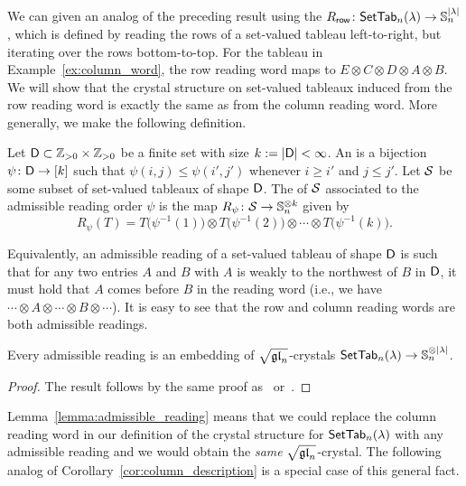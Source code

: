 \documentclass[11pt]{article}
\begin{document}
We can given an analog of the preceding result using the  $R_{\mathsf{row}} \colon \mathsf{SetTab}_n(\lambda) \to \mathbb{S}_n^{\lvert \lambda \rvert}$, which is defined by reading 
the rows of a set-valued tableau
 left-to-right, but iterating over the rows bottom-to-top.
For the tableau in Example~\ref{ex:column_word}, the row reading word maps to $E \otimes C \otimes D \otimes A \otimes B$.
We will show that the crystal structure on set-valued tableaux induced from the row reading word is exactly the same as from the column reading word.
More generally, we make the following definition.

\begin{definition}
Let $\mathsf{D} \subset \mathbb{Z}_{>0} \times \mathbb{Z}_{>0}$ be a finite set with size $k := \lvert \mathsf{D} \rvert < \infty$.
An  is a bijection $\psi \colon \mathsf{D} \to [k]$ such that $\psi(i, j) \leq \psi(i', j')$ whenever $i \geq i'$ and $j \leq j'$.
Let $\mathcal{S}$ be some subset of set-valued tableaux of shape $\mathsf{D}$.
The  of $\mathcal{S}$ associated to the admissible reading order $\psi$ is the map $R_{\psi} \colon \mathcal{S} \to \mathbb{S}_n^{\otimes k}$  given by
\[
R_{\psi}(T) = T\bigl( \psi^{-1}(1) \bigr) \otimes T\bigl( \psi^{-1}(2) \bigr) \otimes \cdots \otimes T\bigl( \psi^{-1}(k) \bigr).
\]
\end{definition}

Equivalently, an admissible reading of a set-valued tableau of shape $\mathsf{D}$ is such that for any two entries $A$ and $B$ with $A$ is weakly to the northwest of $B$ in $\mathsf{D}$, it must hold that $A$ comes before $B$ in the reading word (i.e., we have $\cdots \otimes A \otimes \cdots \otimes B \otimes \cdots$).
It is easy to see that the row and column reading words are both admissible readings.

\begin{lemma}
\label{lemma:admissible_reading}
Every admissible reading is an embedding of $\sqrt{\mathfrak{gl}_n}$-crystals $\mathsf{SetTab}_n(\lambda)\to \mathbb{S}_n^{\otimes \lvert \lambda \rvert}$.
\end{lemma}

\begin{proof}
The result follows by the same proof as~\cite[Thm.~7.3.6]{HK02} or~\cite[Thm.~4.4]{BKK00}.
\end{proof}

Lemma~\ref{lemma:admissible_reading} means that we could replace the column reading word in our definition of the crystal structure for $\mathsf{SetTab}_n(\lambda)$ with any admissible reading and we would obtain the \emph{same} $\sqrt{\mathfrak{gl}_n}$-crystal.
The following analog of Corollary~\ref{cor:column_description} 
is a special case of this general fact.
\end{document}
